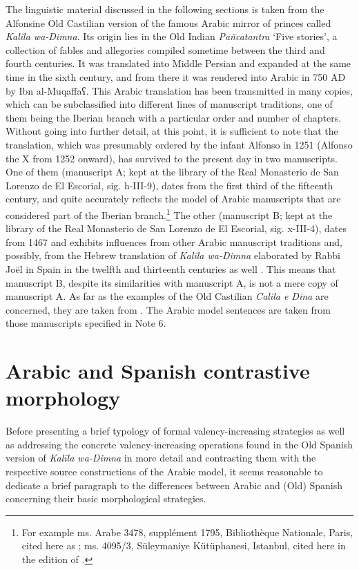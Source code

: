 \documentclass[output=paper]{langscibook}
\begin{document}
The linguistic material discussed in the following sections is taken from the Alfonsine Old Castilian version of the famous Arabic mirror of princes called \textit{Kalīla wa-Dimna}. Its origin lies in the Old Indian \textit{Pañcatantra} ‘Five stories’, a collection of fables and allegories compiled sometime between the third and fourth centuries. It was translated into Middle Persian and expanded at the same time in the sixth century, and from there it was rendered into Arabic in 750 AD by Ibn al-Muqaffaʕ. This Arabic translation has been transmitted in many copies, which can be subclassified into different lines of manuscript traditions, one of them being the Iberian branch with a particular order and number of chapters. Without going into further detail, at this point, it is sufficient to note that the translation, which was presumably ordered by the infant Alfonso in 1251 (Alfonso the X from 1252 onward), has survived to the present day in two manuscripts. One of them (manuscript A; kept at the library of the Real Monasterio de San Lorenzo de El Escorial, sig. h-III-9), dates from the first third of the fifteenth century, and quite accurately reflects the model of Arabic manuscripts that are considered part of the Iberian branch.\footnote{For example ms. Arabe 3478, supplément 1795, Bibliothèque Nationale, Paris, cited here as \citet{ibn_al-muqaffa_kitab_nodate}; ms. 4095/3, Süleymaniye Kütüphanesi, Istanbul, cited here in the edition of \citet{azzam_kitab_1941}.} The other (manuscript B; kept at the library of the Real Monasterio de San Lorenzo de El Escorial, sig. x-III-4), dates from 1467 and exhibits influences from other Arabic manuscript traditions and, possibly, from the Hebrew translation of \textit{Kalīla wa-Dimna} elaborated by Rabbi Joël in Spain in the twelfth and thirteenth centuries as well \citep[57, 78]{dohla_libro_2009}. This means that manuscript B, despite its similarities with manuscript A, is not a mere copy of manuscript A. As far as the examples of the Old Castilian \textit{Calila e Dina} are concerned, they are taken from \citet{dohla_libro_2009}. The Arabic model sentences are taken from those manuscripts specified in Note 6.

\section{Arabic and Spanish contrastive morphology}\label{dohla:sec:3}

Before presenting a brief typology of formal valency-increasing strategies as well as addressing the concrete valency-increasing operations found in the Old Spanish version of \textit{Kalīla wa-Dimna} in more detail and contrasting them with the respective source constructions of the Arabic model, it seems reasonable to dedicate a brief paragraph to the differences between Arabic and (Old) Spanish concerning their basic morphological strategies. 
\end{document}
